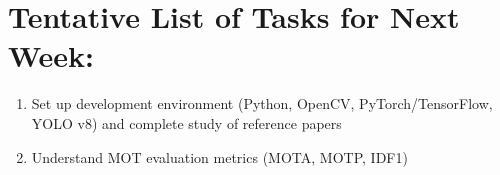 \documentclass[11pt,a4paper]{article}
\begin{document}
	\section*{Tentative List of Tasks for Next Week:}
	
	\begin{enumerate}[leftmargin=*]
		\item Set up development environment (Python, OpenCV, PyTorch/TensorFlow, YOLO v8) and complete study of reference papers
		\item Understand MOT evaluation metrics (MOTA, MOTP, IDF1)
	\end{enumerate}
	
\end{document}
